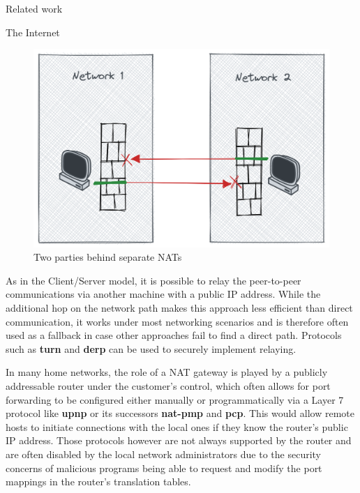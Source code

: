 \begin{frame}[fragile]{Related work}
\begin{block}{The Internet}
\begin{figure}
\centering
\includegraphics[width=\textwidth,height=0.25\textheight]{thesis/../figures/nat-intro.png}
\caption{Two parties behind separate NATs\label{nat-intro}}
\end{figure}

As in the Client/Server model, it is possible to relay the peer-to-peer
communications via another machine with a public IP address. While the
additional hop on the network path makes this approach less efficient
than direct communication, it works under most networking scenarios and
is therefore often used as a fallback in case other approaches fail to
find a direct path. Protocols such as \textbf{\acrfull{turn}}
\autocite{turnRFC} and \textbf{\acrfull{derp}} \autocite{derpDocs} can
be used to securely implement relaying.

In many home networks, the role of a NAT gateway is played by a publicly
addressable router under the customer's control, which often allows for
port forwarding to be configured either manually or programmatically via
a Layer 7 protocol like \textbf{\gls{upnp}} or its successors
\textbf{\gls{nat-pmp}} and \textbf{\gls{pcp}}. This would allow remote
hosts to initiate connections with the local ones if they know the
router's public IP address. Those protocols however are not always
supported by the router and are often disabled by the local network
administrators due to the security concerns of malicious programs being
able to request and modify the port mappings in the router's translation
tables.


\end{block}
\end{frame}
